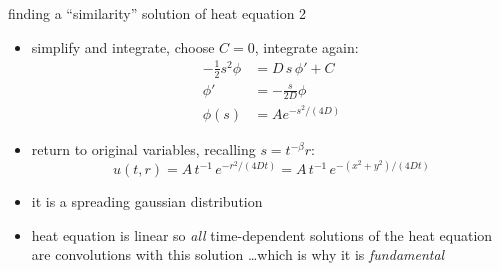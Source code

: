 \begin{frame}{finding a ``similarity'' solution of heat equation 2}

\small
\begin{itemize}
\item simplify and integrate, choose $C=0$, integrate again:
\begin{align*}
  - \frac{1}{2} s^2 \phi &= D\, s\,\phi' + C\\
  \phi' &= - \frac{s}{2D} \phi \\
  \phi(s) &= A e^{-s^2/(4D)}
\end{align*}
\item return to original variables, recalling $s = t^{-\beta} r$:
	$$u(t,r) = A\,t^{-1}\, e^{-r^2/(4Dt)} = A\,t^{-1}\, e^{-(x^2+y^2)/(4Dt)}$$
\item it is a spreading gaussian distribution
\item heat equation is linear so \emph{all} time-dependent solutions of the heat equation are convolutions with this solution \dots which is why it is \emph{fundamental}
\end{itemize}

\begin{center}
\end{center}
\end{frame}


